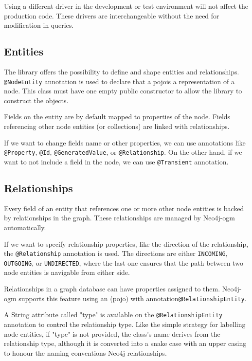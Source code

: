 Using a different driver in the development or test environment will not affect the production code. These drivers are interchangeable without the need for modification in queries.

\subsection {Entities}

The library offers the possibility to define and shape entities and relationships.
\texttt{@NodeEntity} annotation is used to declare that a \acrfull{pojo}is a representation of a node.
This class must have one empty public constructor to allow the library to construct the objects.

Fields on the entity are by default mapped to properties of the node. Fields referencing other node entities (or collections) are linked with relationships.

If we want to change fields name or other properties, we can use annotations like \texttt{@Property}, \texttt{@Id}, \texttt{@GeneratedValue}, or \texttt{@Relationship}.
On the other hand, if we want to not include a field in the node, we can use \texttt{@Transient} annotation.

\subsection {Relationships}

Every field of an entity that references one or more other node entities is backed by relationships in the graph. These relationships are managed by Neo4j-\acrshort{ogm} automatically.

If we want to specify relationship properties, like the direction of the relationship, the \texttt{@Relationship} annotation is used.
The directions are either \texttt{INCOMING}, \texttt{OUTGOING}, or \texttt{UNDIRECTED}, where the last one ensures that the path between two node entities is navigable from either side.

Relationships in a graph database can have properties assigned to them. Neo4j-\acrshort{ogm} supports this feature using an (\acrshort{pojo}) with annotation\linebreak\texttt{@RelationshipEntity}.

A String attribute called "type" is available on the \texttt{@RelationshipEntity} annotation to control the relationship type.
Like the simple strategy for labelling node entities, if "type" is not provided, the class's name derives from the relationship type, although it is converted into a snake case with an upper casing to honour the naming conventions Neo4j relationships. \cite{neo4j_reference_nodate}

